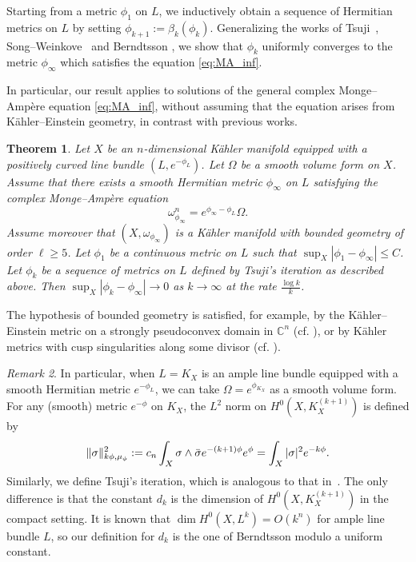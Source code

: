 \documentclass[a4paper, 11pt]{amsart}
\theoremstyle{plain}
\newtheorem{theorem}{Theorem}[section]
\numberwithin{equation}{section} %
\numberwithin{figure}{section} %
\theoremstyle{plain}
\theoremstyle{plain}
\theoremstyle{plain}
\theoremstyle{plain}
\theoremstyle{remark}
\newtheorem{remark}[theorem]{Remark}
\theoremstyle{definition}
\theoremstyle{definition}
\begin{document}
Starting from a metric $\phi_1$ on $L$, we inductively obtain a sequence of Hermitian metrics on $L$ by setting $\phi_{k+1}:= \beta_{k}(\phi_k)$. 
Generalizing the works of Tsuji~\cite{Tsuji10-construction-KE}, Song--Weinkove~\cite{SongWeinkove10-negativecurvature} and Berndtsson \cite{berndtsson09-remarks-tsuji'}, we show that  $\phi_k$ uniformly converges to the metric $\phi_\infty$ which satisfies the equation \eqref{eq:MA_inf}. 

In particular, our result applies to solutions of the general complex Monge--Amp\`ere equation \eqref{eq:MA_inf}, without assuming that the equation arises from K\"ahler--Einstein geometry, in contrast with previous works.



\begin{theorem}\label{thm: main} Let $X$ be an $n$-dimensional K\"ahler manifold equipped with a positively curved line bundle $(L,e^{-\phi_L})$. Let $\Omega$ be a smooth volume form on $X$. 
Assume that there exists a smooth Hermitian metric $\phi_\infty$ on $L$ satisfying the complex Monge--Amp\`ere equation 
\begin{equation}
\omega^n_{\phi_\infty}= e^{\phi_\infty-\phi_L}\Omega.
\end{equation}
Assume moreover that $(X,\omega_{\phi_\infty})$ is a K\"ahler manifold with bounded geometry of order $\ell\geq 5$. 
 Let  $\phi_1$ be a continuous metric on $L$ such that $\sup_X|\phi_1- \phi_{\infty}|\leq C$. Let $\phi_k$ be a sequence of metrics on $L$ defined by Tsuji's iteration as described above.  Then 
 $\sup_X| \phi_k-\phi_\infty|\rightarrow 0$
 as $k\rightarrow \infty$ at the rate $\frac{\log k}{k}$. 
\end{theorem}
{ The hypothesis of bounded geometry is satisfied, for example, by the K\"ahler–Einstein metric on a strongly pseudoconvex domain in  $\mathbb{C}^n$ (cf. \cite{ChengYau80-complete}), or by K\"ahler metrics with cusp singularities along some divisor (cf. \cite{Kobayashi84-KE-open, TianYau87-KE-complete}).}
\begin{remark}
In particular, when $L=K_X$ is an ample line bundle equipped with a smooth Hermitian metric $e^{-\phi_L}$, we can take $\Omega=e^{\phi_{K_X}}$ as a smooth volume form. For any (smooth) metric $e^{-\phi}$ on $K_X$, the $L^2$ norm on $H^0(X,K_X^{(k+1)})$ is defined by   \[\|\sigma\|_{k\phi,\mu_\phi}^2:=c_n\int_X \sigma\wedge\Bar \sigma e^{-(k+1)\phi} e^\phi=\int_X|\sigma|^2e^{-k\phi}.\] Similarly, we define Tsuji's iteration, which is analogous to that in~\cite{berndtsson09-remarks-tsuji'}. The only difference is that the constant  $d_k$ is the dimension of $H^0(X, K_X^{(k+1)})$ in the compact setting. It is known that $\dim H^0(X, L^k)=O(k^n)$ for ample line bundle $L$, so our definition for $d_k$ is the one of Berndtsson modulo a uniform constant. 
\end{remark}
\end{document}
